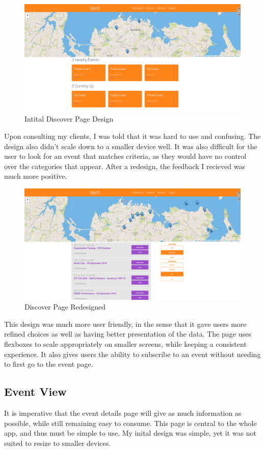 \documentclass[a4paper,oneside,12pt,draft]{report}
\begin{document}
	\begin{figure}[H]
		\caption{Intital Discover Page Design}
		\includegraphics[width=\linewidth]{static/front-end5.png}
	\end{figure}
	
	Upon consulting my clients, I was told that it was hard to use and confusing. The design also didn't scale down to a smaller device well. It was also difficult for the user to look for an event that matches criteria, as they would have no control over the categories that appear. After a redesign, the feedback I recieved was much more positive.

	\begin{figure}[H]
		\caption{Discover Page Redesigned}
		\includegraphics[width=\linewidth]{static/front-end4.png}
	\end{figure}
	
	This design was much more user friendly, in the sense that it gave users more refined choices as well as having better presentation of the data. The page uses flexboxes to scale appropriately on smaller screens, while keeping a consistent experience. It also gives users the ability to subscribe to an event without needing to first go to the event page.

	\subsection{Event View}
	It is imperative that the event details page will give as much information as possible, while still remaining easy to consume. This page is central to the whole app, and thus must be simple to use. My inital design was simple, yet it was not suited to resize to smaller devices.
	
\end{document}
